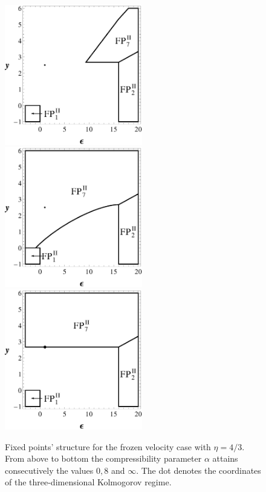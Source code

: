 \documentclass[aps,pre,url,twocolumn,superscriptaddress]{revtex4-1}
\begin{document}
\begin{figure}[h!]
  \includegraphics[width=6cm]{FVF_B_0.eps}
  \includegraphics[width=6cm]{FVF_B_8.eps}
  \includegraphics[width=6cm]{FVF_B_Alpha_Infinity.eps}
  \caption{
  Fixed points' structure for  the frozen velocity case
        with $\eta=4/3$. From above to bottom the compressibility parameter $\alpha$ attains
	consecutively the values $0,8$ and $\infty$.
	The dot denotes the coordinates of  the
	three-dimensional Kolmogorov regime.
  }
  \label{fig:frozen}  
\end{figure}
\end{document}
